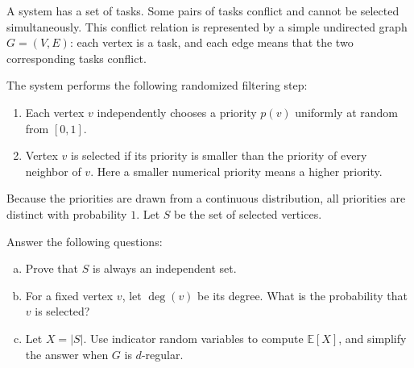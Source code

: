 
A system has a set of tasks. Some pairs of tasks conflict and cannot be selected simultaneously. This conflict relation is represented by a simple undirected graph \(G=(V,E)\): each vertex is a task, and each edge means that the two corresponding tasks conflict.

The system performs the following randomized filtering step:
\begin{enumerate}
    \item Each vertex \(v\) independently chooses a priority \(p(v)\) uniformly at random from \([0,1]\).
    \item Vertex \(v\) is selected if its priority is smaller than the priority of every neighbor of \(v\). Here a smaller numerical priority means a higher priority.
\end{enumerate}

Because the priorities are drawn from a continuous distribution, all priorities are distinct with probability \(1\). Let \(S\) be the set of selected vertices.

Answer the following questions:
\begin{enumerate}[(a)]
    \item Prove that \(S\) is always an independent set.
    \item For a fixed vertex \(v\), let \(\deg(v)\) be its degree. What is the probability that \(v\) is selected?
    \item Let \(X=|S|\). Use indicator random variables to compute \(\mathbb{E}[X]\), and simplify the answer when \(G\) is \(d\)-regular.
\end{enumerate}

